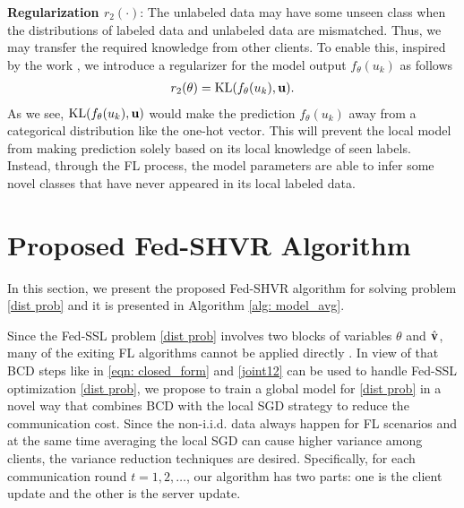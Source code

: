 \documentclass[twoside,journal]{IEEEtran}
\def\VectorFont{\bf}
\newcommand{\vu}{{\VectorFont u}}
\newcommand{\vv}{{\VectorFont v}}
\begin{document}
\textbf{Regularization $r_2(\cdot)$}: The unlabeled data may have some unseen class when the distributions of  labeled data and unlabeled data are  mismatched. Thus, we may transfer the required knowledge from other clients. To enable this, inspired by the work \cite{pereyra2017regularizing}, we introduce a regularizer for the model output $f_{\theta}(u_k)$  as follows
\begin{align}\label{eqn: r2}
r_2(\theta)={\rm KL}(f_{\theta}(u_k),\vu).
\end{align}
As we see,  ${\rm KL}(f_{\theta}(u_k),\vu)$ would make the prediction $f_{\theta}(u_k)$ away from a categorical distribution like the one-hot vector.
This will prevent the local model from making prediction solely based on its local knowledge of seen labels. Instead, through the FL process, the model parameters are able to infer some novel classes that have never appeared  in its local labeled data.



%


\section{Proposed Fed-SHVR Algorithm}\label{sec: FedSAvg}
In this section, we present the proposed Fed-SHVR algorithm for solving problem \eqref{dist prob} and it is presented in Algorithm \ref{alg: model_avg}.

Since the Fed-SSL problem   \eqref{dist prob} involves two blocks of variables $\theta$ and $\hat \vv$, many of the exiting FL algorithms cannot be applied directly \cite{wang2021clustering}. In view of that BCD steps like in \eqref{eqn: closed_form} and \eqref{joint12} can be used to handle Fed-SSL optimization \eqref{dist prob}, we propose to train a global model for \eqref{dist prob} in a novel way that combines BCD with the local SGD strategy \cite{McMahan2017} to reduce the communication cost. Since the non-i.i.d. data always happen for FL scenarios and at the same time averaging the local SGD can cause higher variance among clients, the variance reduction techniques \cite{liang2019variance} are desired. Specifically, for each communication round $t=1,2,\ldots$, our algorithm has two parts: one is the client update  and the other is the server update.
\end{document}
